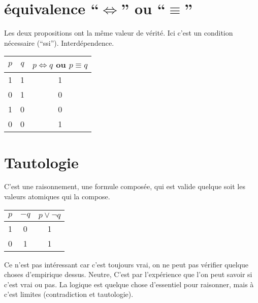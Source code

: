 \section{équivalence ``$\Leftrightarrow$'' ou ``$\equiv$''}
Les deux propositions ont la même valeur de vérité. Ici c'est un condition nécessaire (``ssi''). Interdépendence.
\begin{center}
	\begin{tabular}{|c|c||c|}
		\hline
		$p$&$q$&$p \Leftrightarrow q$ ou $p \equiv q$\\
		\hline
		1&1&1\\
		\hline
		0&1&0\\
		\hline
		1&0&0\\
		\hline
		0&0&1\\
		\hline
	\end{tabular}
\end{center}
\section{Tautologie}
C'est une raisonnement, une formule composée, qui est valide quelque soit les valeurs atomiques qui la compose.
\begin{center}
	\begin{tabular}{|c|c||c|}
		\hline
		$p$&$-q$&$p \lor \lnot q$\\
		\hline
		1&0&1\\
		\hline
		0&1&1\\
		\hline
	\end{tabular}
\end{center}
Ce n'est pas intéressant car c'est toujours vrai, on ne peut pas vérifier quelque choses d'empirique dessus.
Neutre, C'est par l'expérience que l'on peut savoir si c'est vrai ou pas. La logique est quelque chose d'essentiel pour raisonner, mais à c'est limites (contradiction et tautologie).
